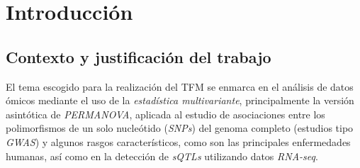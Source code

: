 \documentclass[IB,BIB]{TFUOC}%
\begin{document}


\chapter{Introducción}
\label{chap:Introducción}


\section{Contexto y justificación del trabajo}
\label{sec:Contexto y justificación del trabajo}



%
%
%
%
%
%
%


El tema escogido para la realización del TFM se enmarca en el análisis de datos ómicos mediante el uso de la \textit{\gls{estadística multivariante}}, principalmente la versión asintótica de \textit{\gls{PERMANOVA}}, aplicada al estudio de asociaciones entre los polimorfismos de un solo nucleótido (\textit{\gls{SNPs}}) del genoma completo (estudios tipo \textit{\gls{GWAS}}) y algunos rasgos característicos, como son las principales enfermedades humanas, así como en la detección de \textit{\gls{sQTLs}} utilizando datos \textit{\gls{RNA-seq}}.
\end{document}

